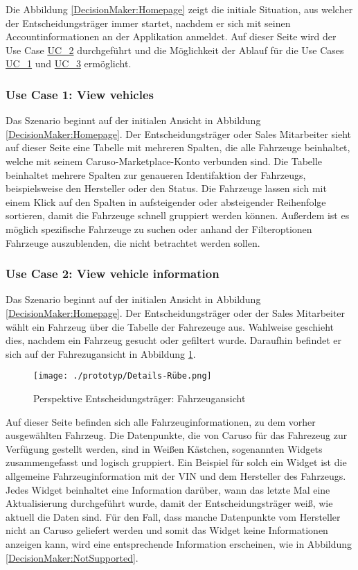 Die Abbildung \ref{DecisionMaker:Homepage} zeigt die initiale Situation, aus welcher der Entscheidungsträger immer startet, nachdem er sich mit seinen Accountinformationen an der Applikation anmeldet. Auf dieser Seite wird der Use Case \hyperlink{Ref:UC2}{UC\_2} durchgeführt und die Möglichkeit der Ablauf für die Use Cases \hyperlink{Ref:UC1}{UC\_1} und \hyperlink{Ref:UC3}{UC\_3} ermöglicht. 


\subsubsection{Use Case 1: View vehicles}
Das Szenario beginnt auf der initialen Ansicht in Abbildung \ref{DecisionMaker:Homepage}. Der Entscheidungsträger oder Sales Mitarbeiter sieht auf dieser Seite eine Tabelle mit mehreren Spalten, die alle Fahrzeuge beinhaltet, welche mit seinem Caruso-Marketplace-Konto verbunden sind. Die Tabelle beinhaltet mehrere Spalten zur genaueren Identifaktion der Fahrzeugs, beispielsweise den Hersteller oder den Status. Die Fahrzeuge lassen sich mit einem Klick auf den Spalten in aufsteigender oder absteigender Reihenfolge sortieren, damit die Fahrzeuge schnell gruppiert werden können. Außerdem ist es möglich spezifische Fahrzeuge zu suchen oder anhand der Filteroptionen Fahrzeuge auszublenden, die nicht betrachtet werden sollen.

\subsubsection{Use Case 2: View vehicle information}
Das Szenario beginnt auf der initialen Ansicht in Abbildung \ref{DecisionMaker:Homepage}. Der Entscheidungsträger oder der Sales Mitarbeiter wählt ein Fahrzeug über die Tabelle der Fahrezeuge aus. Wahlweise geschieht dies, nachdem ein Fahrzeug gesucht oder gefiltert wurde. Daraufhin befindet er sich auf der Fahrezugansicht in Abbildung \ref{DecisionMaker:DetailsRube}.

\begin{figure}[ht]
  \centering
  \texttt{[image: ./prototyp/Details-Rübe.png]}
  \caption{Perspektive Entscheidungsträger: Fahrzeugansicht}
  \label{DecisionMaker:DetailsRube}
\end{figure}

Auf dieser Seite befinden sich alle Fahrzeuginformationen, zu dem vorher ausgewählten Fahrzeug. Die Datenpunkte, die von Caruso für das Fahrezeug zur Verfügung gestellt werden, sind in Weißen Kästchen, sogenannten Widgets zusammengefasst und logisch gruppiert. Ein Beispiel für solch ein Widget ist die allgemeine Fahrzeuginformation mit der VIN und dem Hersteller des Fahrzeugs. Jedes Widget beinhaltet eine Information darüber, wann das letzte Mal eine Aktualisierung durchgeführt wurde, damit der Entscheidungsträger weiß, wie aktuell die Daten sind. Für den Fall, dass manche Datenpunkte vom Hersteller nicht an Caruso geliefert werden und somit das Widget keine Informationen anzeigen kann, wird eine entsprechende Information erscheinen, wie in Abbildung \ref{DecisionMaker:NotSupported}.


